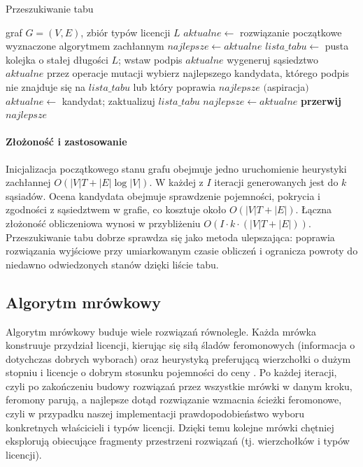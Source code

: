 \begin{algorithm}[H]
  \caption{Przeszukiwanie tabu}\label{alg:tabu}
  \begin{algorithmic}[1]
    \Require graf \(G=(V,E)\), zbiór typów licencji \(L\)
    \State \(aktualne \gets\) rozwiązanie początkowe wyznaczone algorytmem zachłannym
    \State \(najlepsze \gets aktualne\)
    \State \(lista\_tabu \gets\) pusta kolejka o stałej długości \(L\); wstaw podpis \(aktualne\)
    \State wygeneruj sąsiedztwo \(aktualne\) przez operacje mutacji
    \State wybierz najlepszego kandydata, którego podpis nie znajduje się na \(lista\_tabu\) lub który poprawia \(najlepsze\) \((\)aspiracja\()\)
    \State \(aktualne \gets\) kandydat; zaktualizuj \(lista\_tabu\)
     \State \(najlepsze \gets aktualne\) \EndIf
    \Else
    \State \textbf{przerwij}
    \EndIf
    \EndFor
    \State \Return \(najlepsze\)
  \end{algorithmic}
\end{algorithm}

\paragraph{Złożoność i zastosowanie}
Inicjalizacja początkowego stanu grafu obejmuje jedno uruchomienie heurystyki zachłannej \(O(|V|T + |E|\log |V|)\). W każdej z \(I\) iteracji generowanych jest do \(k\) sąsiadów. Ocena kandydata obejmuje sprawdzenie pojemności, pokrycia i zgodności z sąsiedztwem w grafie, co kosztuje około \(O(|V|T + |E|)\). Łączna złożoność obliczeniowa wynosi w przybliżeniu \(O\!\left(I \cdot k \cdot (|V|T + |E|)\right)\). Przeszukiwanie tabu dobrze sprawdza się jako metoda ulepszająca: poprawia rozwiązania wyjściowe przy umiarkowanym czasie obliczeń i ogranicza powroty do niedawno odwiedzonych stanów dzięki liście tabu.

\subsection{Algorytm mrówkowy}\label{subsec:aco}
Algorytm mrówkowy buduje wiele rozwiązań równolegle. Każda mrówka konstruuje przydział licencji, kierując się siłą śladów feromonowych (informacja o dotychczas dobrych wyborach) oraz heurystyką preferującą wierzchołki o dużym stopniu i licencje o dobrym stosunku pojemności do ceny \cite{dorigo1997}. Po każdej iteracji, czyli po zakończeniu budowy rozwiązań przez wszystkie mrówki w danym kroku, feromony parują, a najlepsze dotąd rozwiązanie wzmacnia ścieżki feromonowe, czyli w przypadku naszej implementacji prawdopodobieństwo wyboru konkretnych właścicieli i typów licencji.
Dzięki temu kolejne mrówki chętniej eksplorują obiecujące fragmenty przestrzeni rozwiązań (tj. wierzchołków i typów licencji).
